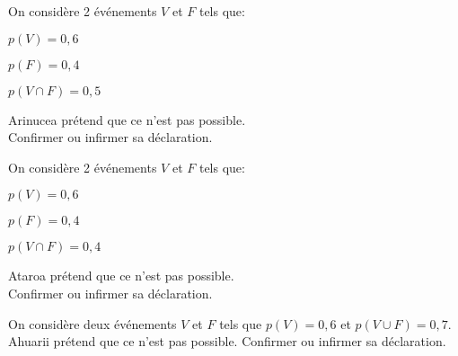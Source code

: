
\begin{exercice}
 On considère 2 événements $V$ et $F$ tels que:
 \begin{colitemize}{2}
 \item $p(V)=0,6$ \item $p(F)=0,4$ \item $p(V\cap F)=0,5$ 
 \end{colitemize} 
Arinucea prétend que ce n'est pas possible.\\ Confirmer ou infirmer sa déclaration. 
\end{exercice}

\begin{exercice}
 On considère 2 événements $V$ et $F$ tels que:
 \begin{colitemize}{2} \item $p(V)=0,6$ \item $p(F)=0,4$ \item $p(V\cap F)=0,4$ \end{colitemize}
Ataroa prétend que ce n'est pas possible.\\ Confirmer ou infirmer sa déclaration. 
\end{exercice}

%  
%  

\begin{exercice}
 On considère deux événements $V$ et $F$ tels que $p(V)=0,6$ et $p(V\cup F)=0,7$. Ahuarii prétend que ce n'est pas possible. Confirmer ou infirmer sa déclaration. 
\end{exercice}



